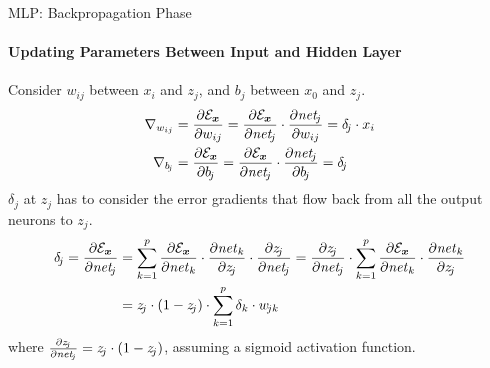 \begin{frame}{MLP: Backpropagation Phase}
\framesubtitle{Updating Parameters Between Input and Hidden Layer}
Consider $w_{ij}$ between $x_i$ and
$z_{\!j}$, and $b_j$ between $x_0$ and
$z_{\!j}$. 
\begin{align*}
    \begin{aligned}
    \grad_{w_{ij}} & = 
 \frac{\partial \cE_\bx}{\partial w_{ij}}
     = \frac{\partial \cE_\bx}{\partial \net_{\!j}} \cdot 
    \frac{\partial \net_{\!j}}{\partial w_{ij}}
    = \delta_{\!j}  \cdot x_i\\
    \grad_{b_{\!j}} & = 
 \frac{\partial \cE_\bx}{\partial b_{\!j}}
     = \frac{\partial \cE_\bx}{\partial \net_{\!j}} \cdot 
    \frac{\partial \net_{\!j}}{\partial b_{\!j}}
    = \delta_{\!j}
\end{aligned}
\end{align*}
%
$\delta_{\!j}$ at %
$z_j$ has %
to consider the error gradients that
flow back from all the output neurons to $z_j$.
\begin{align*}
    \delta_{\!j} = \frac{\partial \cE_\bx}{\partial \net_{\!j}}
    & =
   \sum^{p}_{k=1} \frac{\partial \cE_\bx}{\partial \net_k} \cdot
   \frac{\partial \net_{k}}{\partial z_{\!j}} \cdot
\frac{\partial z_{\!j}}{\partial \net_{\!j}}
    =
\frac{\partial z_{\!j}}{\partial \net_{\!j}} \cdot
   \sum^{p}_{k=1} \frac{\partial \cE_\bx}{\partial \net_k} \cdot
   \frac{\partial \net_{k}}{\partial z_{\!j}} \\
& = z_{\!j} \cdot (1-z_{\!j}) \cdot \sum^{p}_{k=1} \delta_k \cdot w_{\!jk}
\end{align*}
where $\tfrac{\partial z_{\!j}}{\partial \mathit{net}_{\!j}} =
z_{\!j}\cdot(1-z_{\!j})$, %
assuming a sigmoid activation function.
\end{frame}
